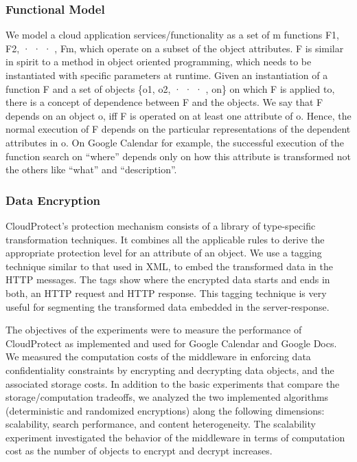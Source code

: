\documentclass[11pt,onecolumn]{article}
\begin{document}
\subsubsection{Functional Model}
We model a cloud application services/functionality as a set of m functions
{F1, F2, · · · , Fm}, which operate on a subset of the object attributes. F is similar in
spirit to a method in object oriented programming, which needs to be instantiated
with specific parameters at runtime. Given an instantiation of a function F and a set
of objects \{o1, o2, · · · , on\} on which F is applied to, there is a concept of dependence
between F and the objects. We say that F depends on an object o, iff F is operated
on at least one attribute of o. Hence, the normal execution of F depends on the
particular representations of the dependent attributes in o. On Google Calendar for
example, the successful execution of the function search on “where” depends only on
how this attribute is transformed not the others like “what” and “description”.

\subsubsection{Data Encryption}
CloudProtect’s protection mechanism consists of a library of type-specific transformation
techniques. It combines all the applicable rules to derive the appropriate
protection level for an attribute of an object. We use a tagging technique similar to
that used in XML, to embed the transformed data in the HTTP messages. The tags
show where the encrypted data starts and ends in both, an HTTP request and HTTP
response. This tagging technique is very useful for segmenting the transformed data
embedded in the server-response.



The objectives of the experiments were to measure the performance of CloudProtect
as implemented and used for Google Calendar and Google Docs. We measured the
computation costs of the middleware in enforcing data confidentiality constraints by
encrypting and decrypting data objects, and the associated storage costs. In addition
to the basic experiments that compare the storage/computation tradeoffs, we analyzed
the two implemented algorithms (deterministic and randomized encryptions)
along the following dimensions: scalability, search performance, and content heterogeneity.
The scalability experiment investigated the behavior of the middleware in
terms of computation cost as the number of objects to encrypt and decrypt increases.
\end{document}
